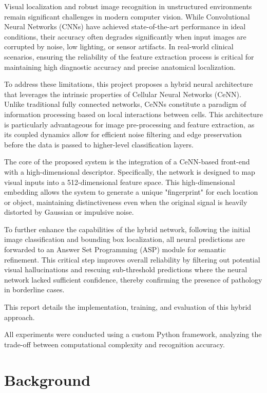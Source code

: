 \documentclass[a4paper,fleqn]{cas-dc}
\begin{document}
Visual localization and robust image recognition in unstructured environments remain significant challenges in modern computer vision. While Convolutional Neural Networks (CNNs) have achieved state-of-the-art performance in ideal conditions, their accuracy often degrades significantly when input images are corrupted by noise, low lighting, or sensor artifacts. In real-world clinical scenarios, ensuring the reliability of the feature extraction process is critical for maintaining high diagnostic accuracy and precise anatomical localization.

To address these limitations, this project proposes a hybrid neural architecture that leverages the intrinsic properties of Cellular Neural Networks (CeNN). Unlike traditional fully connected networks, CeNNs constitute a paradigm of information processing based on local interactions between cells. This architecture is particularly advantageous for image pre-processing and feature extraction, as its coupled dynamics allow for efficient noise filtering and edge preservation before the data is passed to higher-level classification layers.

The core of the proposed system is the integration of a CeNN-based front-end with a high-dimensional descriptor. Specifically, the network is designed to map visual inputs into a 512-dimensional feature space. This high-dimensional embedding allows the system to generate a unique "fingerprint" for each location or object, maintaining distinctiveness even when the original signal is heavily distorted by Gaussian or impulsive noise.

To further enhance the capabilities of the hybrid network, following the initial image classification and bounding box localization, all neural predictions are forwarded to an Answer Set Programming (ASP) module for semantic refinement. This critical step improves overall reliability by filtering out potential visual hallucinations and rescuing sub-threshold predictions where the neural network lacked sufficient confidence, thereby confirming the presence of pathology in borderline cases.

This report details the implementation, training, and evaluation of this hybrid approach. 

All experiments were conducted using a custom Python framework, analyzing the trade-off between computational complexity and recognition accuracy.

\section{Background}
\end{document}
